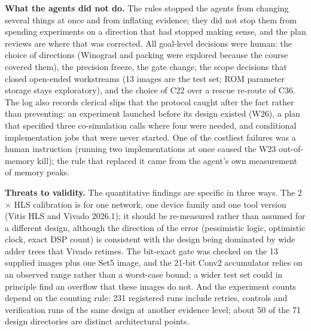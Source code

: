 \textbf{What the agents did not do.} The rules stopped the agents from changing several things at once and from inflating evidence; they did not stop them from spending experiments on a direction that had stopped making sense, and the plan reviews are where that was corrected. All goal-level decisions were human: the choice of directions (Winograd and packing were explored because the course covered them), the precision freeze, the gate change, the scope decisions that closed open-ended workstreams (13 images are the test set; ROM parameter storage stays exploratory), and the choice of C22 over a rescue re-route of C36. The log also records clerical slips that the protocol caught after the fact rather than preventing: an experiment launched before its design existed (W26), a plan that specified three co-simulation calls where four were needed, and conditional implementation jobs that were never started. One of the costliest failures was a human instruction (running two implementations at once caused the W23 out-of-memory kill); the rule that replaced it came from the agent's own measurement of memory peaks.

\textbf{Threats to validity.} The quantitative findings are specific in three ways. The 2$\times$ HLS calibration is for one network, one device family and one tool version (Vitis HLS and Vivado 2026.1); it should be re-measured rather than assumed for a different design, although the direction of the error (pessimistic logic, optimistic clock, exact DSP count) is consistent with the design being dominated by wide adder trees that Vivado retimes. The bit-exact gate was checked on the 13 supplied images plus one Set5 image, and the 21-bit Conv2 accumulator relies on an observed range rather than a worst-case bound; a wider test set could in principle find an overflow that these images do not. And the experiment counts depend on the counting rule: 231 registered runs include retries, controls and verification runs of the same design at another evidence level; about 50 of the 71 design directories are distinct architectural points.

